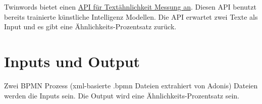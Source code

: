 \documentclass[12pt]{article}
\begin{document}
Twinwords bietet einen \href{https://www.twinword.com/api/text-similarity.php}{API für Textähnlichkeit Messung an}. Diesen API benutzt bereits trainierte künstliche Intelligenz Modellen. Die API erwartet zwei Texte als Input und es gibt eine Ähnlichkeits-Prozentsatz zurück.

\section{Inputs und Output}

Zwei BPMN Prozess (xml-basierte .bpmn Dateien extrahiert von Adonis) Dateien werden die Inputs sein. Die Output wird eine Ähnlichkeits-Prozentsatz sein.




\end{document}
